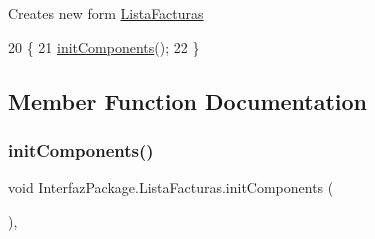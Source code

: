 Creates new form \mbox{\hyperlink{class_interfaz_package_1_1_lista_facturas}{Lista\+Facturas}} 
\begin{DoxyCode}
20                            \{
21         \mbox{\hyperlink{class_interfaz_package_1_1_lista_facturas_a35ba1cdc1b8458715eec0de270b35e21}{initComponents}}();
22     \}
\end{DoxyCode}


\subsection{Member Function Documentation}
\mbox{\label{class_interfaz_package_1_1_lista_facturas_a35ba1cdc1b8458715eec0de270b35e21}} 
\subsubsection{\texorpdfstring{init\+Components()}{initComponents()}}
{\footnotesize\ttfamily void Interfaz\+Package.\+Lista\+Facturas.\+init\+Components (\begin{DoxyParamCaption}{ }\end{DoxyParamCaption})\hspace{0.3cm}{\ttfamily [inline]}, {\ttfamily [private]}}

